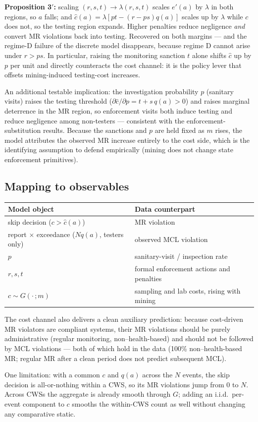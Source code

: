 \documentclass{article}
\begin{document}
\textbf{Proposition 3$'$:} scaling $(r,s,t) \to \lambda(r,s,t)$ scales $e'(a)$ by $\lambda$ in both regions, so $a$ falls; and $\hat{c}(a) = \lambda\left[pt - (r-ps)q(a)\right]$ scales up by $\lambda$ while $c$ does not, so the testing region expands. Higher penalties reduce negligence \emph{and} convert MR violations back into testing. Recovered on both margins --- and the regime-D failure of the discrete model disappears, because regime D cannot arise under $r > ps$. In particular, raising the monitoring sanction $t$ alone shifts $\hat{c}$ up by $p$ per unit and directly counteracts the cost channel: it is the policy lever that offsets mining-induced testing-cost increases.

An additional testable implication: the investigation probability $p$ (sanitary visits) raises the testing threshold ($\partial\hat{c}/\partial p = t + s\,q(a) > 0$) and raises marginal deterrence in the MR region, so enforcement visits both induce testing and reduce negligence among non-testers --- consistent with the enforcement-substitution results. Because the sanctions and $p$ are held fixed as $m$ rises, the model attributes the observed MR increase entirely to the cost side, which is the identifying assumption to defend empirically (mining does not change state enforcement primitives).

\subsection{Mapping to observables}

\begin{center}
\begin{tabular}{ll}
Model object & Data counterpart \\
\hline
skip decision ($c > \hat{c}(a)$) & MR violation \\
report $\times$ exceedance ($N q(a)$, testers only) & observed MCL violation \\
$p$ & sanitary-visit / inspection rate \\
$r, s, t$ & formal enforcement actions and penalties \\
$c \sim G(\cdot\,;m)$ & sampling and lab costs, rising with mining \\
\end{tabular}
\end{center}

The cost channel also delivers a clean auxiliary prediction: because cost-driven MR violators are compliant systems, their MR violations should be purely administrative (regular monitoring, non--health-based) and should not be followed by MCL violations --- both of which hold in the data (100\% non--health-based MR; regular MR after a clean period does not predict subsequent MCL).

One limitation: with a common $c$ and $q(a)$ across the $N$ events, the skip decision is all-or-nothing within a CWS, so its MR violations jump from $0$ to $N$. Across CWSs the aggregate is already smooth through $G$; adding an i.i.d.\ per-event component to $c$ smooths the within-CWS count as well without changing any comparative static.
\end{document}
